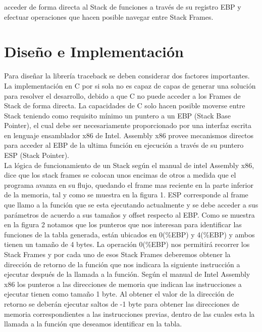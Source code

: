 \documentclass[twocolumn,11pts]{IEEEtran}
\begin{document}
acceder de forma directa al Stack de funciones a través de su registro EBP y efectuar operaciones que hacen posible navegar entre Stack Frames.
\section{Diseño e Implementación}
Para diseñar la librería traceback se deben considerar dos factores importantes. La implementación en C por si sola no es capaz de capas de generar una solución para resolver el desarrollo, debido a que C no puede acceder a los Frames de Stack de forma directa. La capacidades de C solo hacen posible moverse entre Stack teniendo como requisito mínimo un puntero a un EBP (Stack Base Pointer), el cual debe ser necesariamente proporcionado por una interfaz escrita en lenguaje ensamblador x86 de Intel. Assembly x86 provee mecanismos directos para acceder al EBP de la ultima función en ejecución a través de su puntero ESP (Stack Pointer). \\
La lógica de funcionamiento de un Stack según el manual de intel Assembly x86, dice que los stack frames se colocan unos encimas de otros a medida que el programa avanza en su flujo, quedando el frame mas reciente en la parte inferior de la memoria, tal y como se muestra en la figura 1. ESP corresponde al frame que llamo a la función que se esta ejecutando actualmente y se debe acceder a sus parámetros de acuerdo a sus tamaños y offset respecto al EBP. Como se muestra en la figura 2 notamos que los punteros que nos interesan para identificar las funciones de la tabla generada, están ubicados en 0(\%EBP) y 4(\%EBP) y ambos tienen un tamaño de 4 bytes. La operación 0(\%EBP) nos permitirá recorrer los Stack Frames y por cada uno de esos Stack Frames deberemos obtener la dirección de retorno de la función que nos indicara la siguiente instrucción a ejecutar después de la llamada a la función. Según el manual de Intel Assembly x86 los punteros a las direcciones de memoria que indican las instrucciones a ejecutar tienen como tamaño 1 byte. Al obtener el valor de la dirección de retorno se deberán ejecutar saltos de -1 byte para obtener las direcciones de memoria correspondientes a las instrucciones previas, dentro de las cuales esta la llamada a la función que deseamos identificar en la tabla.\\
\end{document}
